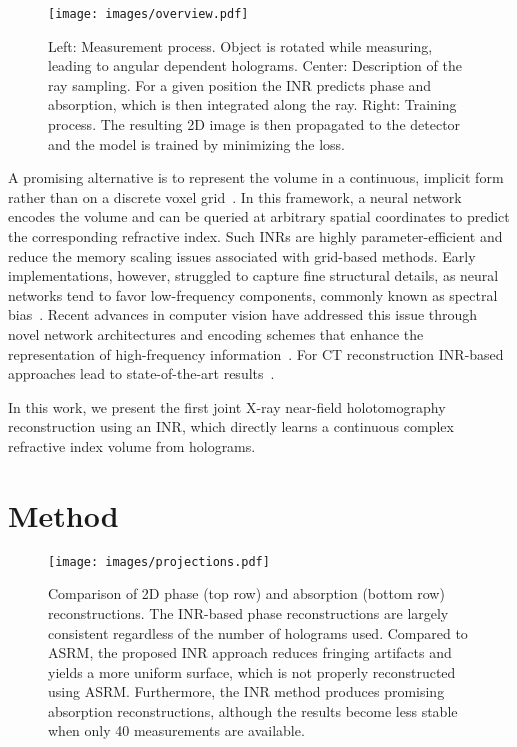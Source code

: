 \documentclass{article}
\begin{document}
\begin{figure*}
	\centering
	\texttt{[image: images/overview.pdf]}
	\caption{Left: Measurement process.
		Object is rotated while measuring, leading to angular dependent holograms.
		Center: Description of the ray sampling.
		For a given position the INR predicts phase and absorption, which is then integrated along the ray.
		Right: Training process.
		The resulting 2D image is then propagated to the detector and the model is trained by minimizing the loss.
	}
	\label{fig:overiew}
\end{figure*}


A promising alternative is to represent the volume in a continuous, implicit form rather than on a discrete voxel grid~\cite{mildenhallNeRFRepresentingScenes2020a}.
In this framework, a neural network encodes the volume and can be queried at arbitrary spatial coordinates to predict the corresponding refractive index.
Such INRs are highly parameter-efficient and reduce the memory scaling issues associated with grid-based methods.
Early implementations, however, struggled to capture fine structural details, as neural networks tend to favor low-frequency components, commonly known as spectral bias~\cite{rahamanSpectralBiasNeural2019}.
Recent advances in computer vision have addressed this issue through novel network architectures and encoding schemes that enhance the representation of high-frequency information~\cite{mildenhallNeRFRepresentingScenes2020a,mullerInstantNeuralGraphics2022}.
For CT reconstruction INR-based approaches lead to state-of-the-art results~\cite{essakineWhereWeStand2025,zhaNAFNeuralAttenuation2022a}.


In this work, we present the first joint X-ray near-field holotomography reconstruction using an INR, which directly learns a continuous complex refractive index volume from holograms.

\section{Method}
\begin{figure*}
	\centering
	\texttt{[image: images/projections.pdf]}
	\caption{
		Comparison of 2D phase (top row) and absorption (bottom row) reconstructions.
		The INR-based phase reconstructions are largely consistent regardless of the number of holograms used.
		Compared to ASRM, the proposed INR approach reduces fringing artifacts and yields a more uniform surface, which is not properly reconstructed using ASRM.
		Furthermore, the INR method produces promising absorption reconstructions, although the results become less stable when only 40 measurements are available.
	}
	\label{fig:projections}
\end{figure*}
\end{document}
